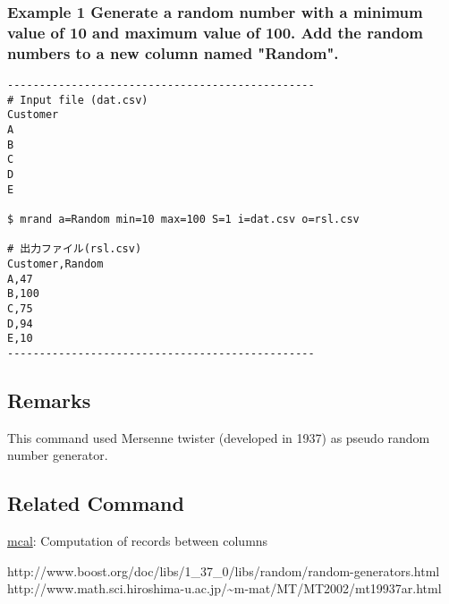\documentclass[a4paper]{jarticle}
\begin{document}
\subsubsection*{Example 1 Generate a random number with a minimum value of 10 and maximum value of 100. Add the random numbers to a new column named "Random".}

\begin{verbatim}
------------------------------------------------
# Input file (dat.csv)
Customer
A
B
C
D
E

$ mrand a=Random min=10 max=100 S=1 i=dat.csv o=rsl.csv

# 出力ファイル(rsl.csv)
Customer,Random
A,47
B,100
C,75
D,94
E,10
------------------------------------------------
\end{verbatim}

\subsection*{Remarks}
This command used Mersenne twister (developed in 1937) as pseudo random number generator.

\subsection*{Related Command}
\noindent
\href{run:mcal.pdf}{mcal}: Computation of records between columns \\

\begin{thebibliography}{9}
http://www.boost.org/doc/libs/1\_37\_0/libs/random/random-generators.html
http://www.math.sci.hiroshima-u.ac.jp/\~{}m-mat/MT/MT2002/mt19937ar.html

\end{thebibliography}
\end{document}
